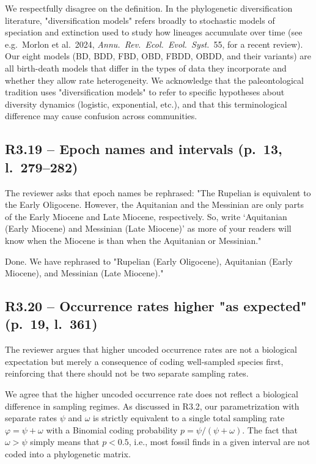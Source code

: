 \documentclass[11pt]{article}
\newcommand{\response}[1]{\noindent\textcolor{resp}{#1}\medskip}
\begin{document}
\response{We respectfully disagree on the definition. In the phylogenetic diversification literature, "diversification models" refers broadly to stochastic models of speciation and extinction used to study how lineages accumulate over time (see e.g.\ Morlon et al.\ 2024, \textit{Annu.\ Rev.\ Ecol.\ Evol.\ Syst.}\ 55, for a recent review). Our eight models (BD, BDD, FBD, OBD, FBDD, OBDD, and their variants) are all birth-death models that differ in the types of data they incorporate and whether they allow rate heterogeneity. We acknowledge that the paleontological tradition uses "diversification models" to refer to specific hypotheses about diversity dynamics (logistic, exponential, etc.), and that this terminological difference may cause confusion across communities.}

\subsection*{R3.19 -- Epoch names and intervals (p.\ 13, l.\ 279--282)}

The reviewer asks that epoch names be rephrased: "The Rupelian is equivalent to the Early Oligocene. However, the Aquitanian and the Messinian are only parts of the Early Miocene and Late Miocene, respectively. So, write `Aquitanian (Early Miocene) and Messinian (Late Miocene)' as more of your readers will know when the Miocene is than when the Aquitanian or Messinian."

\response{Done. We have rephrased to "Rupelian (Early Oligocene), Aquitanian (Early Miocene), and Messinian (Late Miocene)."}

\subsection*{R3.20 -- Occurrence rates higher "as expected" (p.\ 19, l.\ 361)}

The reviewer argues that higher uncoded occurrence rates are not a biological expectation but merely a consequence of coding well-sampled species first, reinforcing that there should not be two separate sampling rates.

\response{We agree that the higher uncoded occurrence rate does not reflect a biological difference in sampling regimes. As discussed in R3.2, our parametrization with separate rates $\psi$ and $\omega$ is strictly equivalent to a single total sampling rate $\varphi = \psi + \omega$ with a Binomial coding probability $p = \psi/(\psi+\omega)$. The fact that $\omega > \psi$ simply means that $p < 0.5$, i.e., most fossil finds in a given interval are not coded into a phylogenetic matrix.}
\end{document}
